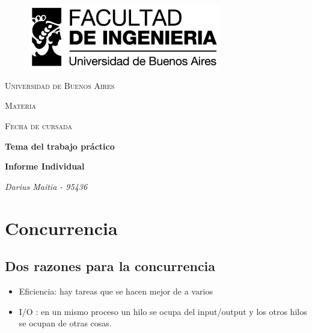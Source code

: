 \documentclass[a4paper]{article}
\author{You}
\begin{document}
\begin{figure}
 \centering
   \includegraphics[width=0.75\textwidth]{fig/fiuba.jpg}
\end{figure}

\begin{titlepage}
		\centering
		{\scshape\LARGE Universidad de Buenos Aires \par}
		\vspace{1cm}
		{\scshape\Large Materia\par}
		\vspace{0.5cm}
		{\scshape\Large Fecha de cursada\par}
		\vspace{1.5cm}
		{\huge\bfseries Tema del trabajo práctico \par}
		\vspace{1.5cm}
		{\huge\bfseries Informe Individual \par}
		\vspace{0.5cm}
		{\Large\itshape Darius Maitia - 95436 \par}
        \vspace{0.5cm}
        
    {\Large\itshape \par}
    \vspace{1cm}  
\end{titlepage}

\tableofcontents
\newpage


\section{Concurrencia}

\subsection{Dos razones para la concurrencia}

\begin{itemize}
\item Eficiencia: hay tareas que se hacen mejor de a varios
\item I/O : en un mismo proceso un hilo se ocupa del input/output y los otros hilos se ocupan de otras cosas.
\end{itemize}
\end{document}
